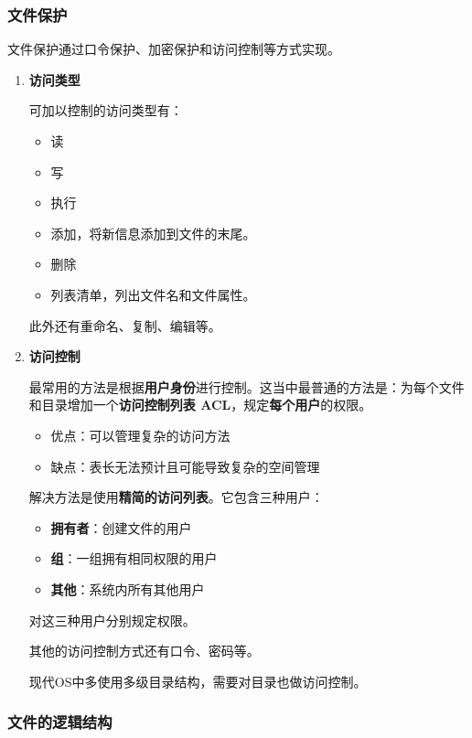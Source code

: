 \documentclass[12pt, a4paper, oneside]{ctexart}
\begin{document}
\subsubsection{文件保护}

文件保护通过口令保护、加密保护和访问控制等方式实现。

\begin{enumerate}
  \item {\bf 访问类型}
  
  可加以控制的访问类型有：
  \begin{itemize}
    \item 读
    \item 写
    \item 执行
    \item 添加，将新信息添加到文件的末尾。
    \item 删除
    \item 列表清单，列出文件名和文件属性。
  \end{itemize}

  此外还有重命名、复制、编辑等。

  \item {\bf 访问控制}
  
  最常用的方法是根据\textbf{用户身份}进行控制。这当中最普通的方法是：为每个文件和目录增加一个\textbf{访问控制列表 ACL}，规定\textbf{每个用户}的权限。
  \begin{itemize}
    \item 优点：可以管理复杂的访问方法
    \item 缺点：表长无法预计且可能导致复杂的空间管理
  \end{itemize}
  
  解决方法是使用\textbf{精简的访问列表}。它包含三种用户：
  \begin{itemize}
    \item {\bf 拥有者}：创建文件的用户
    \item {\bf 组}：一组拥有相同权限的用户
    \item {\bf 其他}：系统内所有其他用户
  \end{itemize}
  对这三种用户分别规定权限。

  其他的访问控制方式还有口令、密码等。

  现代OS中多使用多级目录结构，需要对目录也做访问控制。
\end{enumerate}

\subsubsection{文件的逻辑结构}
\end{document}
